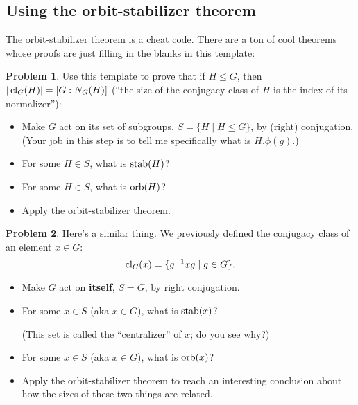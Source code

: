 \documentclass[12pt]{article}
\theoremstyle{definition} %
\newtheorem{problem}{Problem}
\newcommand\inv{^{-1}} %
\begin{document}
\subsection*{Using the orbit-stabilizer theorem}

The orbit-stabilizer theorem is a cheat code. There are a ton of cool theorems whose proofs are just filling in the blanks in this template:

\begin{center}
\end{center}

\begin{problem}\label{ost-conj}
  Use this template to prove that if $H \leq G$, then $|\operatorname{cl}_G(H)| = [G:N_G(H)]$ (``the size of the conjugacy class of $H$ is the index of its normalizer''):
  \begin{itemize}
    \item Make $G$ act on its set of subgroups, $S = \{H \mid H\leq G\}$, by (right) conjugation. \\
    (Your job in this step is to tell me specifically what is $H.\phi(g)$.)
    \item For some $H \in S$, what is $\operatorname{stab}(H)$?
    \item For some $H \in S$, what is $\operatorname{orb}(H)$?
    \item Apply the orbit-stabilizer theorem.
  \end{itemize}
\end{problem}

\begin{problem}\label{ost-cent}
  Here's a similar thing. We previously defined the conjugacy class of an element $x\in G$: \[\cl_G(x) = \{g\inv x g\mid g\in G\}.\]
  \begin{itemize}
    \item Make $G$ act on \textbf{itself}, $S = G$, by right conjugation.
    \item For some $x\in S$ (aka $x\in G$), what is $\operatorname{stab}(x)$? 
    
    (This set is called the ``centralizer'' of $x$; do you see why?)
    \item For some $x\in S$ (aka $x\in G$), what is $\operatorname{orb}(x)$?
    \item Apply the orbit-stabilizer theorem to reach an interesting conclusion about how the sizes of these two things are related.
  \end{itemize}
\end{problem}
\end{document}
